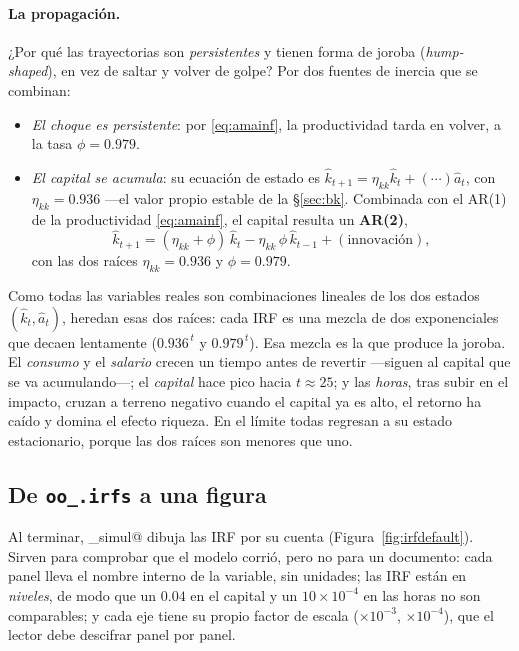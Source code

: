 \documentclass[11pt,a4paper]{report}
\begin{document}
\paragraph{La propagación.} ¿Por qué las trayectorias son \emph{persistentes} y
tienen forma de joroba (\emph{hump-shaped}), en vez de saltar y volver de golpe?
Por dos fuentes de inercia que se combinan:
\begin{itemize}[nosep,leftmargin=1.4em]
\item \emph{El choque es persistente}: por \eqref{eq:amainf}, la productividad
  tarda en volver, a la tasa $\phi=0.979$.
\item \emph{El capital se acumula}: su ecuación de estado es
  $\hat{k}_{t+1}=\eta_{kk}\hat{k}_t+(\cdots)\hat{a}_t$, con $\eta_{kk}=0.936$ ---el
  valor propio estable de la \S\ref{sec:bk}. Combinada con el AR(1) de la
  productividad \eqref{eq:amainf}, el capital resulta un \textbf{AR(2)},
  \[
     \hat{k}_{t+1}=(\eta_{kk}+\phi)\,\hat{k}_t-\eta_{kk}\,\phi\,\hat{k}_{t-1}+(\text{innovación}),
  \]
  con las dos raíces $\eta_{kk}=0.936$ y $\phi=0.979$.
\end{itemize}
Como todas las variables reales son combinaciones lineales de los dos estados
$(\hat{k}_t,\hat{a}_t)$, heredan esas dos raíces: cada IRF es una mezcla de dos
exponenciales que decaen lentamente ($0.936^{\,t}$ y $0.979^{\,t}$). Esa mezcla es
la que produce la joroba. El \emph{consumo} y el \emph{salario} crecen un tiempo
antes de revertir ---siguen al capital que se va acumulando---; el \emph{capital}
hace pico hacia $t\approx25$; y las \emph{horas}, tras subir en el impacto, cruzan
a terreno negativo cuando el capital ya es alto, el retorno ha caído y domina el
efecto riqueza. En el límite todas regresan a su estado estacionario, porque las
dos raíces son menores que uno.

\subsection{De \texttt{oo\_.irfs} a una figura}
\label{sec:irfgraf}

Al terminar, \lstinline@stoch_simul@ dibuja las IRF por su cuenta
(Figura~\ref{fig:irfdefault}). Sirven para comprobar que el modelo corrió, pero no para
un documento: cada panel lleva el nombre interno de la variable, sin unidades; las
IRF están en \emph{niveles}, de modo que un $0.04$ en el capital y un $10\times10^{-4}$
en las horas no son comparables; y cada eje tiene su propio factor de escala
($\times10^{-3}$, $\times10^{-4}$), que el lector debe descifrar panel por panel.
\end{document}
